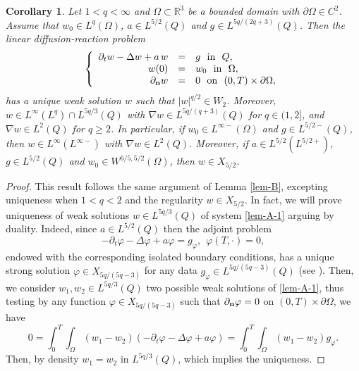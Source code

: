 \documentclass[11pt,reqno]{amsart}%
\newtheorem{corollary}[theorem]{Corollary}
\numberwithin{equation}{section}
\begin{document}
{%
  \begin{corollary}\label{lem-A}
 Let $1< q<\infty$ and 
 $\Omega\subset\mathbb{R}^3$ be a bounded domain with $\partial\Omega\in C^2$. 
 Assume that $w_0\in L^{q}(\Omega)$,  $a\in L^{5/2}(Q)$ and $g\in L^{5q/(2q+3)}(Q)$. Then the
 linear diffusion-reaction problem 
 \begin{equation}\label{lem-A-1}
 \left\{
 \begin{array}{rcl}
 \partial_tw-\Delta w+a\, w&=&g\ \mbox{ in }\ Q,\\
 w(0)&=&w_0\ \mbox{ in }\ \Omega,\\
 \partial_{\bf n}w&=&0\ \mbox{ on }\ (0,T)\times\partial\Omega,
 \end{array}
 \right.
 \end{equation}
 has a unique weak solution 
 $w$ such that $|w|^{q/2}\in W_2$. Moreover, 
 $w\in L^\infty(L^q)\cap L^{5q/3}(Q)$ with $\nabla w\in L^{5q/(q+3)}(Q)$ for $q\in(1,2]$, and $\nabla w\in L^2(Q)$ for $q\ge2$.  In particular, if $w_0\in L^{\infty-}(\Omega)$ and $g\in L^{5/2-}(Q)$, then  
 $w\in L^\infty(L^{\infty-})$ with $\nabla w\in L^2(Q)$. %
  Moreover, if $a\in L^{5/2}(L^{5/2+})$, $g\in L^{5/2}(Q)$ and $w_0\in W^{6/5,5/2}(\Omega)$, 
  then $w\in X_{5/2}$.
 
 \end{corollary}
 \begin{proof} 
 This result follows the same argument of Lemma \ref{lem-B}, excepting uniqueness when $1<q<2$ and the regularity  $w\in X_{5/2}$. 
 In fact, we will prove uniqueness of weak solutions $w\in L^{5q/3}(Q)$ of system \eqref{lem-A-1} arguing by duality. Indeed, since $a\in L^{5/2}(Q)$ %
  then the adjoint problem
$$
-\partial_t\varphi-\Delta\varphi
+a\varphi=g_\varphi,\ \ \varphi(T,\cdot)=0,
$$
endowed with the corresponding isolated boundary conditions, has a unique strong solution $\varphi\in X_{5q/(5q-3)}$ for any data $g_\varphi\in L^{5q/(5q-3)}(Q)$ (see \cite[Theorem A.1]{Andre_SICOM}). 
Then, we consider $w_1,w_2\in L^{5q/3}(Q)$ two possible weak solutions of \eqref{lem-A-1}, thus testing by any function $\varphi\in 
X_{5q/(5q-3)}$ such that $\partial_{\bf n}\varphi=0$ on $(0,T)\times \partial\Omega$, we have
$$
0=\int_0^T\int_\Omega(w_1-w_2)\left(-\partial_t\varphi-\Delta\varphi%
+a\varphi\right)
=\int_0^T\int_\Omega(w_1-w_2)g_\varphi.
$$
Then, by density $w_1=w_2$ in $L^{5q/3}(Q)$, which implies the uniqueness. 


\end{proof}}
\end{document}
